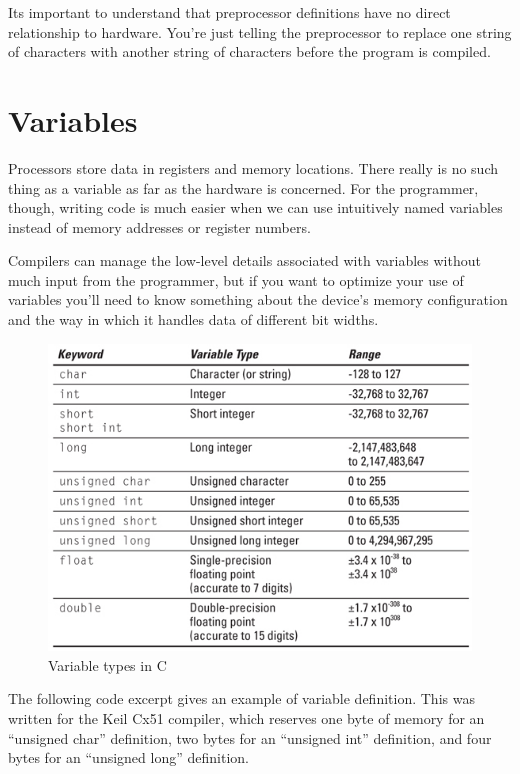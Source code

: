         Its important to understand that preprocessor definitions have no direct relationship to hardware. You’re just telling the preprocessor to replace one string of characters with another string of characters before the program is compiled.
    
    \section{Variables} \label{sec:section_cl.3}
        Processors store data in registers and memory locations. There really is no such thing as a variable as far as the hardware is concerned. For the programmer, though, writing code is much easier when we can use intuitively named variables instead of memory addresses or register numbers.
            
        Compilers can manage the low-level details associated with variables without much input from the programmer, but if you want to optimize your use of variables you'll need to know something about the device’s memory configuration and the way in which it handles data of different bit widths.

        \begin{figure}[!ht]
                \centering
                \captionsetup{justification=centering,margin=0.05cm}
                \includegraphics[width=0.8\columnwidth]{figures/variable-in-c.jpg}
                \caption{\label{fig:variable-in-c}Variable types in C}
        \end{figure}
            
        The following code excerpt gives an example of variable definition. This was written for the Keil Cx51 compiler, which reserves one byte of memory for an “unsigned char” definition, two bytes for an “unsigned int” definition, and four bytes for an “unsigned long” definition.
            

